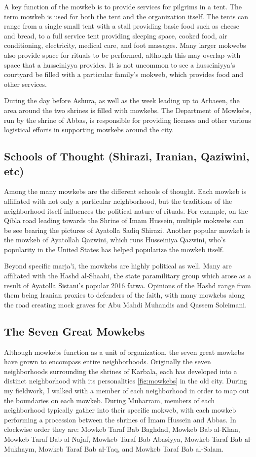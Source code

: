 A key function of the mowkeb is to provide services for pilgrims in a tent. The term mowkeb is used for both the tent and the organization itself. The tents can range from a single small tent with a stall providing basic food such as cheese and bread, to a full service tent providing sleeping space, cooked food, air conditioning, electricity, medical care, and foot massages. Many larger mokwebs also provide space for rituals to be performed, although this may overlap with space that a husseiniyya provides. It is not uncommon to see a husseiniyya's courtyard be filled with a particular family's mokweb, which provides food and other services. 

During the day before Ashura, as well as the week leading up to Arbaeen, the area around the two shrines is filled with mowkebs. The Department of Mowkebs, run by the shrine of Abbas, is responsible for providing licenses and other various logistical efforts in supporting mowkebs around the city. 

\subsection{Schools of Thought (Shirazi, Iranian, Qaziwini, etc)}
Among the many mowkebs are the different schools of thought. Each mowkeb is affiliated with not only a particular neighborhood, but the traditions of the neighborhood itself influences the political nature of rituals. For example, on the Qibla road leading towards the Shrine of Imam Hussein, multiple mokwebs can be see bearing the pictures of Ayatolla Sadiq Shirazi. Another popular mowkeb is the mowkeb of Ayatollah Qazwini, which runs Husseiniya Qazwini, who’s popularity in the United States has helped popularize the mowkeb itself. 

Beyond specific marja’i, the mowkebs are highly political as well. Many are affiliated with the Hashd al-Shaabi, the state paramilitary group which arose as a result of Ayatolla Sistani’s popular 2016 fatwa. Opinions of the Hashd range from them being Iranian proxies to defenders of the faith, with many mowkebs along the road creating mock graves for Abu Mahdi Muhandis and Qassem Soleimani. 

\subsection{The Seven Great Mowkebs}
Although mowkebs function as a unit of organization, the seven great mowkebs have grown to encompass entire neighborhoods. Originally the seven neighborhoods surrounding the shrines of Karbala, each has developed into a distinct neighborhood with its personalities \ref{fig:mowkebs} in the old city. During my fieldwork, I walked with a member of each neighborhood in order to map out the boundaries on each mowkeb. During Muharram, members of each neighborhood typically gather into their specific mokweb, with each mowkeb performing a procession between the shrines of Imam Hussein and Abbas. In clockwise order they are: Mowkeb Taraf Bab Baghdad, Mowkeb Bab al-Khan, Mowkeb Taraf Bab al-Najaf, Mowkeb Taraf Bab Abasiyya, Mowkeb Taraf Bab al-Mukhaym, Mowkeb Taraf Bab al-Taq, and Mowkeb Taraf Bab al-Salam.

